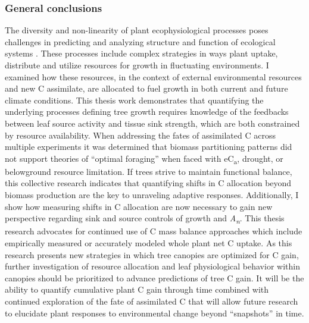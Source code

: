 \documentclass[a4paper]{article}
\begin{document}
\subsubsection*{General conclusions}
The diversity and non-linearity of plant ecophysiological processes poses challenges in predicting and analyzing structure and function of ecological systems \citep{field1983allocating}. These processes include complex strategies in ways plant uptake, distribute and utilize resources for growth in fluctuating environments. I examined how these resources, in the context of external environmental resources and new C assimilate, are allocated to fuel growth in both current and future climate conditions. This thesis work demonstrates that quantifying the underlying processes defining tree growth requires knowledge of the feedbacks between leaf source activity and tissue sink strength, which are both constrained by resource availability.  When addressing the fates of assimilated C across multiple experiments it was determined that biomass partitioning patterns did not support theories of \enquote{optimal foraging} when faced with eC\textsubscript{a}, drought, or belowground resource limitation. If trees strive to maintain functional balance, this collective research indicates that quantifying shifts in C allocation beyond biomass production are the key to unraveling adaptive responses. Additionally, I show how measuring shifts in C allocation are now necessary to gain new perspective regarding sink and source controls of growth and \textit{A\textsubscript{n}}. This thesis research advocates for continued use of C mass balance approaches which include empirically measured or accurately modeled whole plant net C uptake. As this research presents new strategies in which tree canopies are optimized for C gain, further investigation of resource allocation and leaf physiological behavior within canopies should be prioritized to advance predictions of tree C gain. It will be the ability to quantify cumulative plant C gain through time combined with continued exploration of the fate of assimilated C that will allow future research to elucidate plant responses to environmental change beyond \enquote{snapshots} in time.
\end{document}
